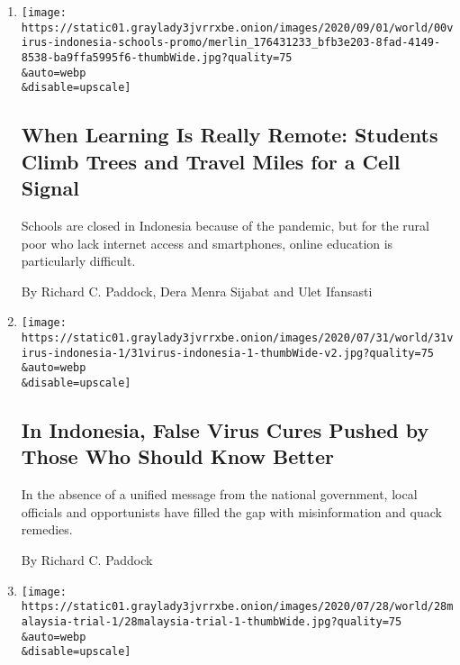 \begin{enumerate}
\def\labelenumi{\arabic{enumi}.}
\item
  \href{/2020/09/05/world/asia/coronavirus-indonesia-school-remote-learning.html}{}

  \texttt{[image: https://static01.graylady3jvrrxbe.onion/images/2020/09/01/world/00virus-indonesia-schools-promo/merlin\_176431233\_bfb3e203-8fad-4149-8538-ba9ffa5995f6-thumbWide.jpg?quality=75\\\&auto=webp\\\&disable=upscale]}

  \hypertarget{when-learning-is-really-remote-students-climb-trees-and-travel-miles-for-a-cell-signal}{%
  \subsection{When Learning Is Really Remote: Students Climb Trees and
  Travel Miles for a Cell
  Signal}\label{when-learning-is-really-remote-students-climb-trees-and-travel-miles-for-a-cell-signal}}

  Schools are closed in Indonesia because of the pandemic, but for the
  rural poor who lack internet access and smartphones, online education
  is particularly difficult.

  By Richard C. Paddock, Dera Menra Sijabat and Ulet Ifansasti
\item
  \href{/2020/07/31/world/asia/indonesia-coronavirus.html}{}

  \texttt{[image: https://static01.graylady3jvrrxbe.onion/images/2020/07/31/world/31virus-indonesia-1/31virus-indonesia-1-thumbWide-v2.jpg?quality=75\\\&auto=webp\\\&disable=upscale]}

  \hypertarget{in-indonesia-false-virus-cures-pushed-by-those-who-should-know-better}{%
  \subsection{In Indonesia, False Virus Cures Pushed by Those Who Should
  Know
  Better}\label{in-indonesia-false-virus-cures-pushed-by-those-who-should-know-better}}

  In the absence of a unified message from the national government,
  local officials and opportunists have filled the gap with
  misinformation and quack remedies.

  By Richard C. Paddock
\item
  \href{/2020/07/28/world/asia/malaysia-1mdb-najib.html}{}

  \texttt{[image: https://static01.graylady3jvrrxbe.onion/images/2020/07/28/world/28malaysia-trial-1/28malaysia-trial-1-thumbWide.jpg?quality=75\\\&auto=webp\\\&disable=upscale]}


\end{enumerate}
